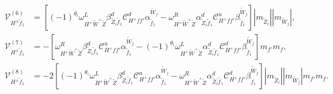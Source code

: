 \documentclass[final,3p,times,pdflatex]{elsarticle}
\begin{document}
\begin{align}
\mathcal{V}_{H^{\pm} \tilde{f}_1}^{(6)} &= [(-1)^{\theta_i} \omega_{H^+ \tilde{W}^+ \tilde{Z}}^L \beta_{\tilde{Z}_i \tilde{f}_1}^{d} \mathcal{C}_{H^+ f f'}^d \alpha_{\tilde{f}_1}^{\tilde{W}_j} - \omega_{H^+ \tilde{W}^+ \tilde{Z}}^R \alpha_{\tilde{Z}_i \tilde{f}_1}^{d} \mathcal{C}_{H^+ f f'}^u \beta_{\tilde{f}_1}^{\tilde{W}_j}]|m_{\tilde{Z}_i}||m_{\tilde{W}_j}|, \\
\mathcal{V}_{H^{\pm} \tilde{f}_1}^{(7)} &= -[\omega_{H^+ \tilde{W}^+ \tilde{Z}}^R \beta_{\tilde{Z}_i \tilde{f}_1}^{d} \mathcal{C}_{H^+ f f'}^u \alpha_{\tilde{f}_1}^{\tilde{W}_j} - (-1)^{\theta_i} \omega_{H^+ \tilde{W}^+ \tilde{Z}}^L \alpha_{\tilde{Z}_i \tilde{f}_1}^{d} \mathcal{C}_{H^+ f f'}^d \beta_{\tilde{f}_1}^{\tilde{W}_j}]m_{f'}m_{f}, \\
\mathcal{V}_{H^{\pm} \tilde{f}_1}^{(8)} &= -2[(-1)^{\theta_i} \omega_{H^+ \tilde{W}^+ \tilde{Z}}^L \beta_{\tilde{Z}_i \tilde{f}_1}^{d} \mathcal{C}_{H^+ f f'}^u \alpha_{\tilde{f}_1}^{\tilde{W}_j} - \omega_{H^+ \tilde{W}^+ \tilde{Z}}^R \alpha_{\tilde{Z}_i \tilde{f}_1}^{d} \mathcal{C}_{H^+ f f'}^d \beta_{\tilde{f}_1}^{\tilde{W}_j}]|m_{\tilde{Z}_i}||m_{\tilde{W}_j}|m_{f'}m_{f}.
\end{align}
\end{document}
